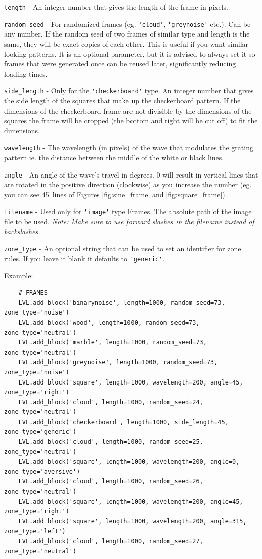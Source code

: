 \documentclass[11pt,a4paper]{article}
\newcommand{\param}[1]{\item \texttt{#1} -}
\newcommand{\note}[1]{\textit{Note: {#1}}}
\begin{document}
\begin{paramlist}
\param{length} An integer number that gives the length of the frame in pixels.
\param{random\_seed} For randomized frames (eg. \lstinline{'cloud'}, \lstinline{'greynoise'} etc.). Can be any number. If the random seed of two frames of similar type and length is the same, they will be exact copies of each other. This is useful if you want similar looking patterns. It is an optional parameter, but it is advised to always set it so frames that were generated once can be reused later, significantly reducing loading times.
\param{side\_length} Only for the \lstinline{'checkerboard'} type. An integer number that gives the side length of the squares that make up the checkerboard pattern. If the dimensions of the checkerboard frame are not divisible by the dimensions of the squares the frame will be cropped (the bottom and right will be cut off) to fit the dimensions.
\param{wavelength} The wavelength (in pixels) of the wave that modulates the grating pattern ie. the distance between the middle of the white or black lines.
\param{angle} An angle of the wave's travel in degrees. 0 will result in vertical lines that are rotated in the positive direction (clockwise) as you increase the number (eg. you can see 45\degree ~lines of Figures \ref{fig:sine_frame} and \ref{fig:square_frame}).
\param{filename} Used only for \lstinline{'image'} type Frames. The absolute path of the image file to be used. \note{Make sure to use forward slashes in the filename instead of backslashes.}
\param{zone\_type} An optional string that can be used to set an identifier for zone rules. If you leave it blank it defaults to \lstinline{'generic'}.
\end{paramlist}

Example:
\begin{lstlisting}
	# FRAMES
	LVL.add_block('binarynoise', length=1000, random_seed=73, zone_type='noise')
	LVL.add_block('wood', length=1000, random_seed=73, zone_type='neutral')
	LVL.add_block('marble', length=1000, random_seed=73, zone_type='neutral')
	LVL.add_block('greynoise', length=1000, random_seed=73, zone_type='noise')
	LVL.add_block('square', length=1000, wavelength=200, angle=45, zone_type='right')
	LVL.add_block('cloud', length=1000, random_seed=24, zone_type='neutral')
	LVL.add_block('checkerboard', length=1000, side_length=45, zone_type='generic')
	LVL.add_block('cloud', length=1000, random_seed=25, zone_type='neutral')
	LVL.add_block('square', length=1000, wavelength=200, angle=0, zone_type='aversive')
	LVL.add_block('cloud', length=1000, random_seed=26, zone_type='neutral')
	LVL.add_block('square', length=1000, wavelength=200, angle=45, zone_type='right')
	LVL.add_block('square', length=1000, wavelength=200, angle=315, zone_type='left')
	LVL.add_block('cloud', length=1000, random_seed=27, zone_type='neutral')
\end{lstlisting}
\end{document}
